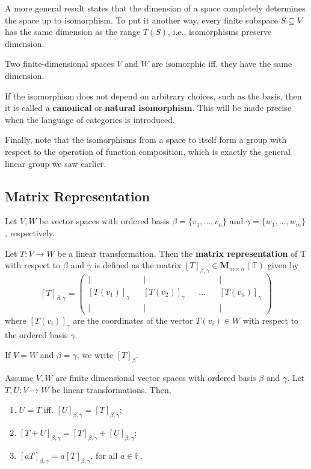 A more general result states that the dimension of a space completely determines the space up to isomorphism. To put it another way, every finite subspace $S \subseteq V$ has the same dimension as the range $T(S)$, i.e., isomorphisms preserve dimension.

\begin{theorem}
	Two finite-dimensional spaces $V$ and $W$ are isomorphic iff. they have the same dimension.
\end{theorem}

If the isomorphism does not depend on arbitrary choices, such as the basis, then it is called a \textbf{canonical} or \textbf{natural isomorphism}. This will be made precise when the language of categories is introduced.

Finally, note that the isomorphisms from a space to itself form a group with respect to the operation of function composition, which is exactly the general linear group we saw earlier.

\subsection{Matrix Representation}

\begin{definition}
	Let $V, W$ be vector spaces with ordered basis $\beta = \{ v_1, \ldots, v_n \}$ and $\gamma = \{ w_1, \ldots, w_m \}$, respectively.

	Let $T : V \longrightarrow W$ be a linear transformation. Then the \textbf{matrix representation} of T with respect to $\beta$ and $\gamma$ is defined as the matrix $[T]_{\beta, \gamma} \in \textbf{M}_{m \times n}(\mathbb{F})$ given by 
	\[
		[T]_{\beta, \gamma} = \left(\begin{matrix}
			\big| && \big| && && \big| \\
			[T(v_1)]_\gamma &&  [T(v_2)]_\gamma && \ldots && [T(v_n)]_\gamma \\
			\big| && \big| && && \big|
			\end{matrix}\right)
	\]
	where $[T(v_i)]_\gamma$ are the coordinates of the vector $T(v_i) \in W$ with respect to the ordered basis $\gamma$.

	If $V = W$ and $\beta = \gamma$, we write $[T]_\beta$.
\end{definition}

\begin{theorem}
	Assume $V, W$ are finite dimensional vector spaces with ordered basis $\beta$ and $\gamma$. Let $T, U : V \longrightarrow W$ be linear transformations. Then,
	\begin{enumerate}
		\item $U = T$ iff. $[U]_{\beta,\gamma} = [T]_{\beta,\gamma}$;
		\item $[T+U]_{\beta,\gamma} = [T]_{\beta,\gamma} + [U]_{\beta,\gamma}$;
		\item $[aT]_{\beta,\gamma} = a[T]_{\beta,\gamma}$, for all $a \in \mathbb{F}$.
	\end{enumerate}
\end{theorem}

